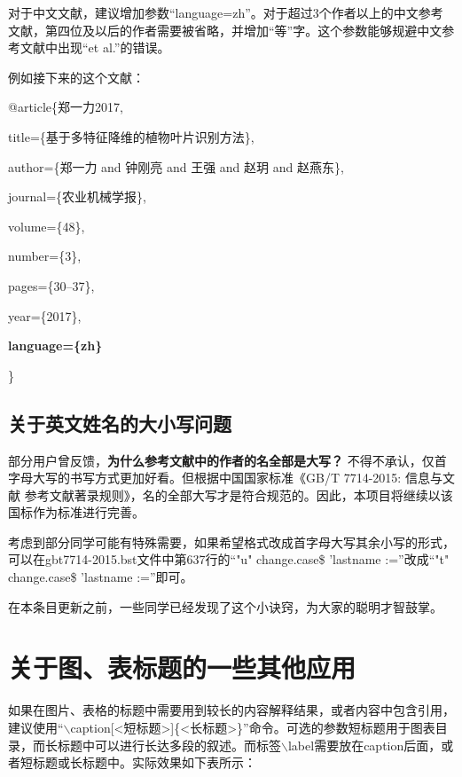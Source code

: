 对于中文文献，建议增加参数“language={zh}”。对于超过3个作者以上的中文参考文献，第四位及以后的作者需要被省略，并增加“等”字。这个参数能够规避中文参考文献中出现“et al.”的错误。

例如接下来的这个文献：

@article\{郑一力2017,

  \hspace{2em} title=\{基于多特征降维的植物叶片识别方法\},
  
  \hspace{2em} author=\{郑一力 and 钟刚亮 and 王强 and 赵玥 and 赵燕东\},
  
  \hspace{2em} journal=\{农业机械学报\},
  
  \hspace{2em} volume=\{48\},
  
  \hspace{2em} number=\{3\},
  
  \hspace{2em} pages=\{30--37\},
  
  \hspace{2em} year=\{2017\},
  
  \hspace{2em} \textbf{language=\{zh\}}
  
\}

\subsection{关于英文姓名的大小写问题}

部分用户曾反馈，\textbf{为什么参考文献中的作者的名全部是大写？}
不得不承认，仅首字母大写的书写方式更加好看。但根据中国国家标准《GB/T 7714-2015: 信息与文献 参考文献著录规则》，名的全部大写才是符合规范的。因此，本项目将继续以该国标作为标准进行完善。

考虑到部分同学可能有特殊需要，如果希望格式改成首字母大写其余小写的形式，可以在gbt7714-2015.bst文件中第637行的“"u" change.case\$ 'lastname :=”改成“"t" change.case\$ 'lastname :=”即可。

在本条目更新之前，一些同学已经发现了这个小诀窍，为大家的聪明才智鼓掌。


\section{关于图、表标题的一些其他应用}

如果在图片、表格的标题中需要用到较长的内容解释结果，或者内容中包含引用，建议使用``$\backslash$caption[<短标题>]\{<长标题>\}''命令。可选的参数短标题用于图表目录，而长标题中可以进行长达多段的叙述。而标签$\backslash$label需要放在caption后面，或者短标题或长标题中。实际效果如下表所示：

